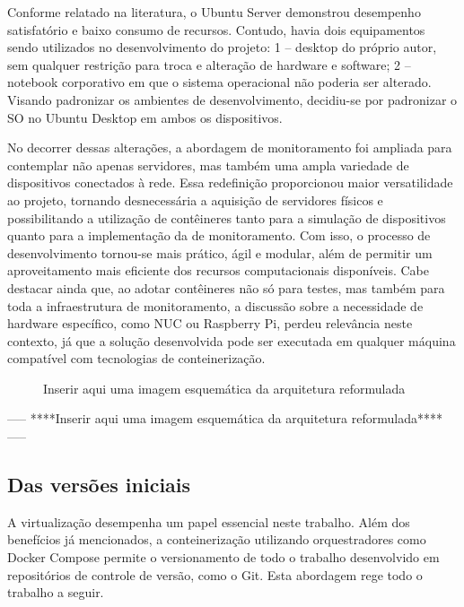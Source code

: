 Conforme relatado na literatura, o Ubuntu Server demonstrou desempenho satisfatório e baixo consumo de recursos. Contudo, havia dois equipamentos sendo utilizados no desenvolvimento do projeto: 1 -- desktop do próprio autor, sem qualquer restrição para troca e alteração de hardware e software; 2 -- notebook corporativo em que o sistema operacional não poderia ser alterado. Visando padronizar os ambientes de desenvolvimento, decidiu-se por padronizar o SO no Ubuntu Desktop em ambos os dispositivos.

No decorrer dessas alterações, a abordagem de monitoramento foi ampliada para contemplar não apenas servidores, mas também uma ampla variedade de dispositivos conectados à rede. Essa redefinição proporcionou maior versatilidade ao projeto, tornando desnecessária a aquisição de servidores físicos e possibilitando a utilização de contêineres tanto para a simulação de dispositivos quanto para a implementação da  de monitoramento. Com isso, o processo de desenvolvimento tornou-se mais prático, ágil e modular, além de permitir um aproveitamento mais eficiente dos recursos computacionais disponíveis. Cabe destacar ainda que, ao adotar contêineres não só para testes, mas também para toda a infraestrutura de monitoramento, a discussão sobre a necessidade de hardware específico, como NUC ou Raspberry Pi, perdeu relevância neste contexto, já que a solução desenvolvida pode ser executada em qualquer máquina compatível com tecnologias de conteinerização.


\begin{figure}[H]
\centering
\fbox{\rule{0pt}{150pt} \rule{200pt}{0pt}} %
\caption{Inserir aqui uma imagem esquemática da arquitetura reformulada}
\label{fig:placeholder2}
\end{figure}

-----
****Inserir aqui uma imagem esquemática da arquitetura reformulada****
-----


\subsection{Das versões iniciais}
\label{subsection:VersõesIniciais}

A virtualização desempenha um papel essencial neste trabalho. Além dos benefícios já mencionados, a conteinerização utilizando orquestradores como Docker Compose permite o versionamento de todo o trabalho desenvolvido em repositórios de controle de versão, como o Git. Esta abordagem rege todo o trabalho a seguir.

